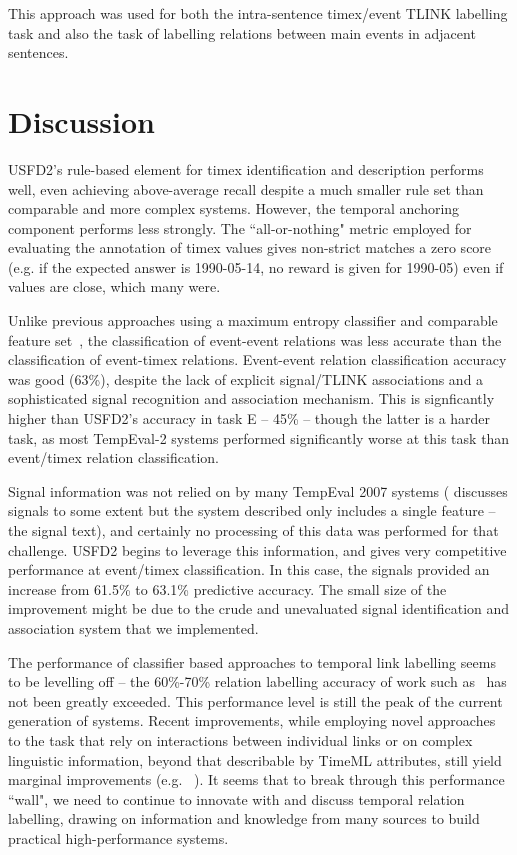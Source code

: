 \documentclass[11pt]{article}
\begin{document}
This approach was used for both the intra-sentence timex/event TLINK labelling task and also the task of labelling relations between main events in adjacent sentences.

\section{Discussion}
\label{discussion}
USFD2's rule-based element for timex identification and description performs well, even achieving above-average recall despite a much smaller rule set than comparable and more complex systems. However, the temporal anchoring component performs less strongly. The ``all-or-nothing" metric employed for evaluating the annotation of timex values gives non-strict matches a zero score (e.g. if the expected answer is 1990-05-14, no reward is given for 1990-05) even if values are close, which many were.

Unlike previous approaches using a maximum entropy classifier and comparable feature set~\cite{mani2006machine,derczynski2010signals}, the classification of event-event relations was less accurate than the classification of event-timex relations. Event-event relation classification accuracy was good (63\%), despite the lack of explicit signal/TLINK associations and a sophisticated signal recognition and association mechanism. This is signficantly higher than USFD2's accuracy in task E -- 45\% -- though the latter is a harder task, as most TempEval-2 systems performed significantly worse at this task than event/timex relation classification.

Signal information was not relied on by many TempEval 2007 systems ( discusses signals to some extent but the system described only includes a single feature -- the signal text), and certainly no processing of this data was performed for that challenge. USFD2 begins to leverage this information, and gives very competitive performance at event/timex classification. In this case, the signals provided an increase from 61.5\% to 63.1\% predictive accuracy. The small size of the improvement might be due to the crude and unevaluated signal identification and association system that we implemented.

The performance of classifier based approaches to temporal link labelling seems to be levelling off -- the 60\%-70\% relation labelling accuracy of work such as~ has not been greatly exceeded. This performance level is still the peak of the current generation of systems. Recent improvements, while employing novel approaches to the task that rely on interactions between individual links or on complex linguistic information, beyond that describable by TimeML attributes, still yield marginal improvements (e.g. ~). It seems that to break through this performance ``wall", we need to continue to innovate with and discuss temporal relation labelling, drawing on information and knowledge from many sources to build practical high-performance systems.
\end{document}

